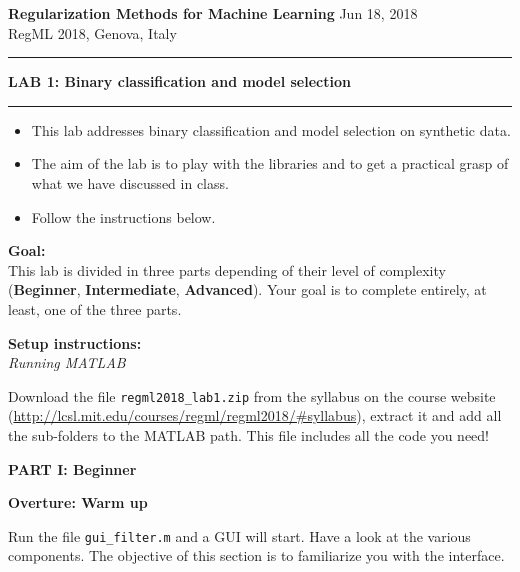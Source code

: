 \documentclass[DIN, pagenumber=false, fontsize=11pt, parskip=half]{scrartcl}
\newcommand{\mytitle}[1]{{\noindent\LARGE\textbf{#1}}}
\newcommand{\mysection}[1]{\noindent\large\textbf{#1}}
\begin{document}
\noindent\textbf{Regularization Methods for Machine Learning} \hfill Jun 18, 2018\\
RegML 2018, Genova, Italy \\ \rule{\textwidth}{1pt}

\mytitle{LAB 1: Binary classification and model selection}
\rule{\textwidth}{1pt}
\begin{itemize}\itemsep1pt \parskip0pt 
  \item This lab addresses binary classification and model selection on synthetic data.
  \item The aim of the lab is to play with the libraries and to get a practical grasp of what we have discussed in class.
  \item Follow the instructions below. 

\end{itemize}

\begin{framed}
\textbf{\textbf{Goal}:} \\
This lab is divided in three parts depending of their level of complexity (\textbf{Beginner}, \textbf{Intermediate}, \textbf{Advanced}). Your goal is to complete entirely, at least, one of the three parts.
\end{framed}


\begin{framed}
\textbf{\textbf{Setup instructions}:} \\
\textit{Running MATLAB}

 Download the file \texttt{regml2018\_lab1.zip} from the syllabus on the course website (\url{http://lcsl.mit.edu/courses/regml/regml2018/\#syllabus}), extract it and add all the sub-folders to the MATLAB path. This file includes all the code you need!
\end{framed}

\pagebreak
\begin{center}
\large\textbf{PART I: Beginner}
\end{center}

\mysection{Overture: Warm up}

\noindent Run the file \texttt{gui\_filter.m} and a GUI will start. Have a look at the various components.
The objective of this section is to familiarize you with the interface.
\end{document}
